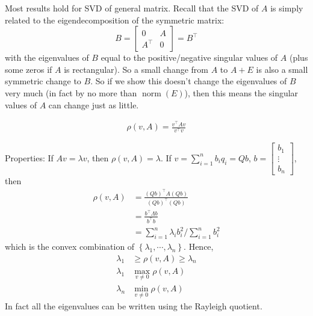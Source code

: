 \documentclass[11pt]{article}
\numberwithin{equation}{section}
\begin{document}
Most results hold for SVD of general matrix. Recall that the SVD of $A$ is simply related to the eigendecomposition of the symmetric matrix:
$$B=\left[\begin{array}{ll}0 & A \\ A^{\top} & 0\end{array}\right]=B^\top$$
with the eigenvalues of $B$ equal to the positive/negative singular values of $A$ (plus some zeros if $A$ is rectangular).
So a small change from $A$ to $A+E$ is also a small symmetric change to $B$. 
So if we show this doesn't change the eigenvalues of $B$ very much (in fact by no more than $\operatorname{norm}(E)$), 
then this means the singular values of $A$ can change just as little.

\begin{definition}
    \begin{align*}
        \rho(v, A) = \frac{v^\top Av}{v^\top v}
    \end{align*}
\end{definition}
Properties: If $Av=\lambda v$, then $\rho(v,A)=\lambda$. If $v=\sum_{i=1}^n b_i q_i=Qb$, $b=\left[\begin{array}{c}b_{1} \\ \vdots \\ b_{n}\end{array}\right]$, then \begin{align*}
    \rho(v, A) &= \frac{(Qb)^\top A(Qb)}{(Qb)^\top (Qb)} \\
    &= \frac{b^\top \Lambda b}{b^\top b} \\
    &= \sum_{i=1}^n \lambda_i b_i^2 / \sum_{i=1}^n b_i^2
\end{align*}
which is the convex combination of $\left\{ \lambda_1, \cdots,\lambda_n \right\}$. Hence, \begin{align*}
    \lambda_1 &\geq \rho(v, A) \geq \lambda_n \\
    \lambda_1 &\max_{v \neq 0}\rho(v, A) \\
    \lambda_n &\min_{v \neq 0}\rho(v, A)
\end{align*}
In fact all the eigenvalues can be written using the Rayleigh quotient.
\end{document}
